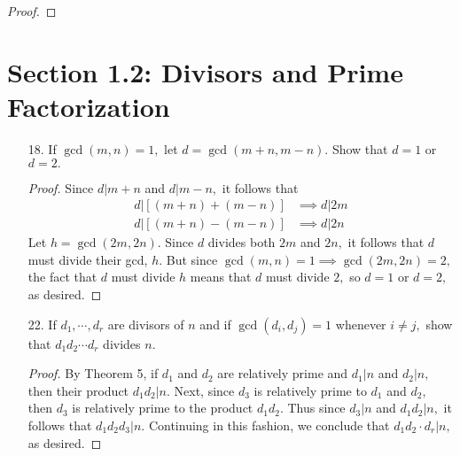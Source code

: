 \documentclass{article}
\begin{document}
\begin{itemize}
\begin{proof}
		\end{proof}

\end{itemize}

\section*{Section 1.2: Divisors and Prime Factorization}

\begin{itemize}
	\item[18.] If $\gcd{(m, n)} = 1,$ let $d = \gcd{(m + n, m - n)}.$ Show that $d = 1$ or $d = 2.$
		\begin{proof}
			Since $d|m+n$ and $d|m-n,$ it follows that 
			\begin{align*}
				d|[(m+n)+(m-n)] &\implies d|2m \\
				d|[(m+n)-(m-n)] &\implies d|2n
			\end{align*} 
			Let $h=\gcd(2m, 2n).$ Since $d$ divides both $2m$ and $2n,$ it follows that $d$ must divide their gcd, $h.$ But since $\gcd(m, n)=1\implies \gcd(2m, 2n)=2,$ the fact that $d$ must divide $h$ means that $d$ must divide $2,$ so $d=1$ or $d=2,$ as desired.
			
		\end{proof}

	\newpage

	\item[22.] If $d_1, \cdots, d_r$ are divisors of $n$ and if $\gcd{(d_i, d_j)} = 1$ whenever $i\neq j,$ show that $d_1d_2\cdots d_r$ divides $n.$ 
		\begin{proof}
			By Theorem 5, if $d_1$ and $d_2$ are relatively prime and $d_1|n$ and $d_2|n,$ then their product $d_1d_2|n.$ Next, since $d_3$ is relatively prime to $d_1$ and $d_2,$ then $d_3$ is relatively prime to the product $d_1d_2.$ Thus since $d_3|n$ and $d_1d_2|n,$ it follows that $d_1d_2d_3|n.$ Continuing in this fashion, we conclude that $d_1d_2\cdot d_r|n,$ as desired.
			
		\end{proof}


\end{itemize}
\end{document}
